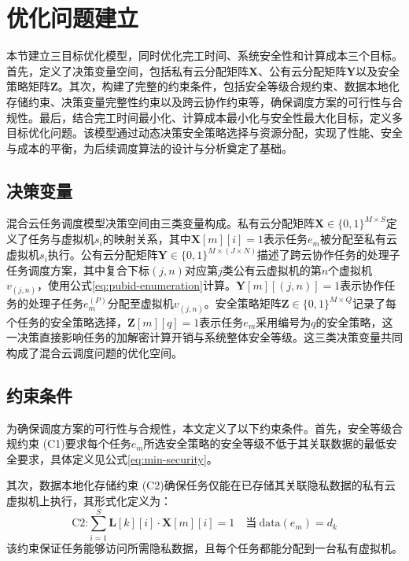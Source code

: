 \section{优化问题建立}\label{sec:opt-prob}

本节建立三目标优化模型，同时优化完工时间、系统安全性和计算成本三个目标。首先，定义了决策变量空间，包括私有云分配矩阵\(\mathbf{X}\)、公有云分配矩阵\(\mathbf{Y}\)以及安全策略矩阵\(\mathbf{Z}\)。其次，构建了完整的约束条件，包括安全等级合规约束、数据本地化存储约束、决策变量完整性约束以及跨云协作约束等，确保调度方案的可行性与合规性。最后，结合完工时间最小化、计算成本最小化与安全性最大化目标，定义多目标优化问题。该模型通过动态决策安全策略选择与资源分配，实现了性能、安全与成本的平衡，为后续调度算法的设计与分析奠定了基础。

\subsection{决策变量}
混合云任务调度模型决策空间由三类变量构成。私有云分配矩阵\(\mathbf{X} \in \{0,1\}^{M \times S}\)定义了任务与虚拟机\(s_i\)的映射关系，其中\(\mathbf{X}[m][i] = 1\)表示任务\(e_m\)被分配至私有云虚拟机\(s_i\)执行。公有云分配矩阵\(\mathbf{Y} \in \{0,1\}^{M \times (J \times N)}\)描述了跨云协作任务的处理子任务调度方案，其中复合下标\((j,n)\)对应第\(j\)类公有云虚拟机的第\(n\)个虚拟机\(v_{(j,n)}\)，使用公式\eqref{eq:pubid-enumeration}计算。\(\mathbf{Y}[m][(j,n)] = 1\)表示协作任务的处理子任务\(e_m^{(P)}\)分配至虚拟机\(v_{(j,n)}\)。安全策略矩阵\(\mathbf{Z} \in \{0,1\}^{M \times Q}\)记录了每个任务的安全策略选择，\(\mathbf{Z}[m][q] = 1\)表示任务\(e_m\)采用编号为\(q\)的安全策略，这一决策直接影响任务的加解密计算开销与系统整体安全等级。这三类决策变量共同构成了混合云调度问题的优化空间。

\subsection{约束条件}

为确保调度方案的可行性与合规性，本文定义了以下约束条件。首先，安全等级合规约束 (C1)要求每个任务\(e_m\)所选安全策略的安全等级不低于其关联数据的最低安全要求，具体定义见公式\eqref{eq:min-security}。

其次，数据本地化存储约束 (C2)确保任务仅能在已存储其关联隐私数据的私有云虚拟机上执行，其形式化定义为：
\begin{equation}
    \text{C2:} \sum_{i=1}^S \mathbf{L}[k][i] \cdot \mathbf{X}[m][i] = 1 \quad \text{当} \ \text{data}(e_m)=d_k
    \label{eq:cst-data-location}
\end{equation}
该约束保证任务能够访问所需隐私数据，且每个任务都能分配到一台私有虚拟机。

